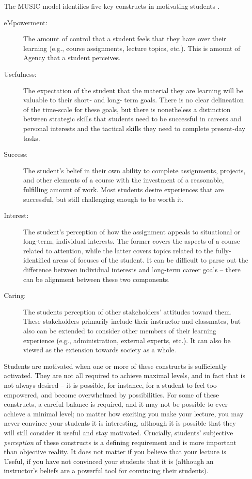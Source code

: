 The MUSIC model identifies five key constructs in motivating students \cite{jones-description}.
\begin{description}
	\item[eMpowerment:] The amount of control that a student feels that they have over their learning (e.g., course assignments, lecture topics, etc.). This is amount of Agency that a student perceives.
	\item[Usefulness:] The expectation of the student that the material they are learning will be valuable to their short- and long- term goals. There is no clear delineation of the time-scale for these goals, but there is nonetheless a distinction between strategic skills that students need to be successful in careers and personal interests and the tactical skills they need to complete present-day tasks.
	\item[Success:] The student's belief in their own ability to complete assignments, projects, and other elements of a course with the investment of a reasonable, fulfilling amount of work. Most students desire experiences that are successful, but still challenging enough to be worth it.
	\item[Interest:] The student's perception of how the assignment appeals to situational or long-term, individual interests. The former covers the aspects of a course related to attention, while the latter covers topics related to the fully-identified areas of focuses of the student. It can be difficult to parse out the difference between individual interests and long-term career goals -- there can be alignment between these two components.
	\item[Caring:] The students perception of other stakeholders' attitudes toward them. These stakeholders primarily include their instructor and classmates, but also can be extended to consider other members of their learning experience (e.g., administration, external experts, etc.). It can also be viewed as the extension towards society as a whole.
\end{description}

Students are motivated when one or more of these constructs is sufficiently activated.
They are not all required to achieve maximal levels, and in fact that is not always desired -- it is possible, for instance, for a student to feel too empowered, and become overwhelmed by possibilities.
For some of these constructs, a careful balance is required, and it may not be possible to ever achieve a minimal level; no matter how exciting you make your lecture, you may never convince your students it is interesting, although it is possible that they will still consider it useful and stay motivated.
Crucially, students' subjective \textit{perception} of these constructs is a defining requirement and is more important than objective reality.
It does not matter if you believe that your lecture is Useful, if you have not convinced your students that it is (although an instructor's beliefs are a powerful tool for convincing their students).

